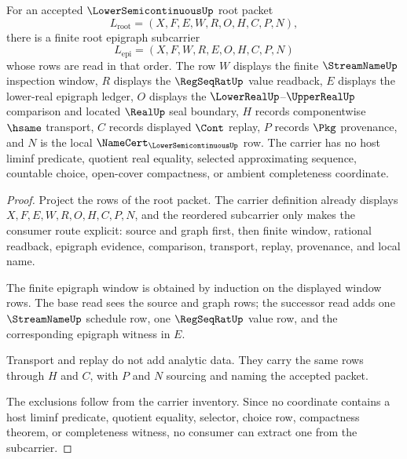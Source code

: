 \begin{theorem}
\label{thm:lowersemicontinuous-root-epigraph-carrier}
For an accepted $\LowerSemicontinuousUp$ root packet
$$
L_{\mathrm{root}}=(X,F,E,W,R,O,H,C,P,N),
$$
there is a finite root epigraph subcarrier
$$
L_{\mathrm{epi}}=(X,F,W,R,E,O,H,C,P,N)
$$
whose rows are read in that order. The row $W$ displays the finite $\StreamNameUp$ inspection window, $R$ displays the $\RegSeqRatUp$ value readback, $E$ displays the lower-real epigraph ledger, $O$ displays the $\LowerRealUp$--$\UpperRealUp$ comparison and located $\RealUp$ seal boundary, $H$ records componentwise $\hsame$ transport, $C$ records displayed $\Cont$ replay, $P$ records $\Pkg$ provenance, and $N$ is the local $\NameCert_{\LowerSemicontinuousUp}$ row. The carrier has no host liminf predicate, quotient real equality, selected approximating sequence, countable choice, open-cover compactness, or ambient completeness coordinate.
\end{theorem}
\begin{proof}
Project the rows of the root packet. The carrier definition already displays $X,F,E,W,R,O,H,C,P,N$, and the reordered subcarrier only makes the consumer route explicit: source and graph first, then finite window, rational readback, epigraph evidence, comparison, transport, replay, provenance, and local name.

The finite epigraph window is obtained by induction on the displayed window rows. The base read sees the source and graph rows; the successor read adds one $\StreamNameUp$ schedule row, one $\RegSeqRatUp$ value row, and the corresponding epigraph witness in $E$.

Transport and replay do not add analytic data. They carry the same rows through $H$ and $C$, with $P$ and $N$ sourcing and naming the accepted packet.

The exclusions follow from the carrier inventory. Since no coordinate contains a host liminf predicate, quotient equality, selector, choice row, compactness theorem, or completeness witness, no consumer can extract one from the subcarrier.
\end{proof}

